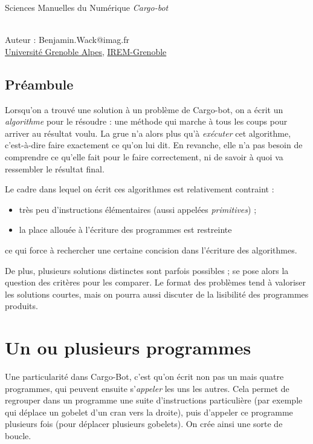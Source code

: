 \documentclass[a4paper,12pt,fleqn]{article}
\begin{document}
\thispagestyle{empty}

\vspace{-2cm}
\noindent
{\Large {Sciences Manuelles du Numérique \textit{Cargo-bot}}
}\hfill %

\noindent \hrulefill

\noindent
\textbf{}\\
\noindent
Auteur : Benjamin.Wack@imag.fr\\
\noindent
\href{http://www.univ-grenoble-alpes.fr/}{Université Grenoble Alpes},
\href{http://www-irem.ujf-grenoble.fr/}{IREM-Grenoble}

\subsection*{Préambule}
Lorsqu'on a trouvé une solution à un problème de Cargo-bot, on a écrit un
\emph{algorithme} pour le résoudre : une méthode qui marche à tous les
coups pour arriver au résultat voulu. La grue n'a alors plus qu'à
\emph{exécuter} cet algorithme, c'est-à-dire faire exactement ce qu'on
lui dit. En revanche, elle n'a pas besoin de \og comprendre \fg{} ce
qu'elle fait pour le faire correctement, ni de savoir à quoi va
ressembler le résultat final.


\medskip
Le cadre dans lequel on écrit ces algorithmes est relativement
contraint :
\begin{itemize}
\item très peu d'instructions élémentaires (aussi appelées \emph{primitives}) ;
\item la place allouée à l'écriture des programmes est restreinte
\end{itemize}
ce qui force à rechercher une certaine concision dans l'écriture des
algorithmes.

\medskip
De plus, plusieurs solutions distinctes sont parfois possibles ; se
pose alors la question des critères pour les comparer. Le format des
problèmes tend à valoriser les solutions courtes, mais on pourra aussi
discuter de la lisibilité des programmes produits.

\section*{Un ou plusieurs programmes}

Une particularité dans Cargo-Bot, c'est qu'on écrit non pas un mais
quatre programmes, qui peuvent ensuite s'\emph{appeler} les uns les
autres. Cela permet de regrouper dans un programme une suite
d'instructions particulière (par exemple qui déplace un gobelet d'un cran
vers la droite), puis d'appeler ce programme plusieurs fois (pour
déplacer plusieurs gobelets). On crée ainsi une sorte de boucle.
\end{document}
